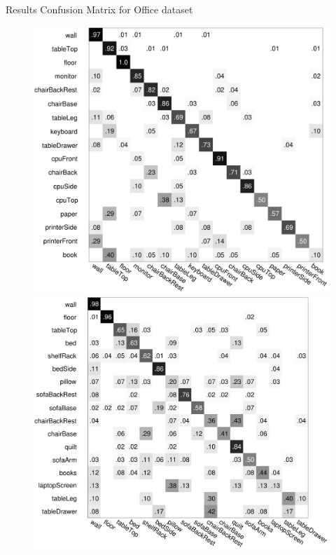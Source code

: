 \documentclass{beamer}
\begin{document}
\begin{frame}{Results}
Confusion Matrix for Office dataset
  \begin{figure}
		\includegraphics[scale=0.18]{objassoc_office_radius0_6.pdf}              
		\includegraphics[scale=0.18]{objassoc_home_radius0_6.pdf} 
	\end{figure}

\end{frame}
\end{document}
